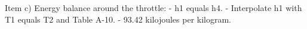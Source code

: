 Item c) Energy balance around the throttle:
- h1 equals h4.
- Interpolate h1 with T1 equals T2 and Table A-10.
- 93.42 kilojoules per kilogram.
